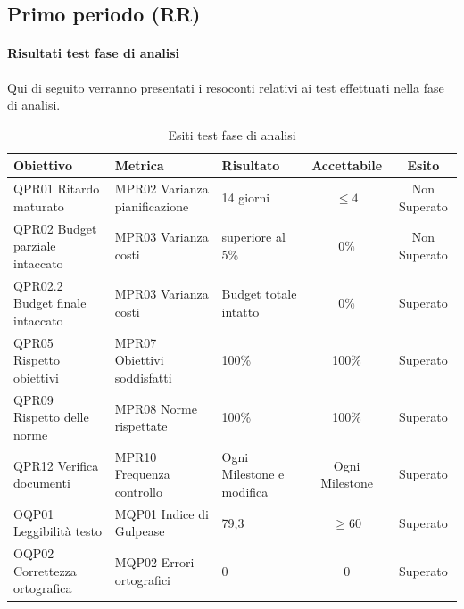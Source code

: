 \documentclass[../piano_di_qualifica.tex]{subfiles}
\begin{document}
\subsection{Primo periodo (RR)}
\label{sub:periodo-RR}
\paragraph{Risultati test fase di analisi}
Qui di seguito verranno presentati i resoconti relativi ai test effettuati nella fase di analisi. \par

\begin{table}[!ht]
	\centering
	\begin{tabular}{|p{4cm}|p{4cm}|l|c|c|}
		\hline
		\rowcolor{lightgray}
		\textbf{Obiettivo}            			& \textbf{Metrica}              & \textbf{Risultato}                    & \textbf{Accettabile} & \textbf{Esito} \\
		\hline
		QPR01 Ritardo maturato        			& MPR02 Varianza pianificazione & 14 giorni                             & \(\leq 4\)           & Non Superato   \\
		QPR02 Budget parziale intaccato        	& MPR03 Varianza costi          & superiore al 5\%									& 0\%                  & Non Superato   \\
		QPR02.2 Budget finale intaccato        	& MPR03 Varianza costi          & Budget totale intatto					& 0\%                  & Superato       \\
		QPR05 Rispetto obiettivi      			& MPR07 Obiettivi soddisfatti   & 100\%                                 & 100\%                & Superato       \\
		QPR09 Rispetto delle norme   			& MPR08 Norme rispettate        & 100\%                                 & 100\%                & Superato       \\
		QPR12 Verifica documenti      			& MPR10 Frequenza controllo     & Ogni Milestone e modifica         	& Ogni Milestone       & Superato       \\
		OQP01 Leggibilità testo       			& MQP01 Indice di Gulpease      & 79,3                                  & \(\ge 60\)           & Superato       \\
		OQP02 Correttezza ortografica 			& MQP02 Errori ortografici      & 0                                     & 0                    & Superato       \\
		\hline
	\end{tabular}
	\caption{Esiti test fase di analisi}
\end{table}
\end{document}
